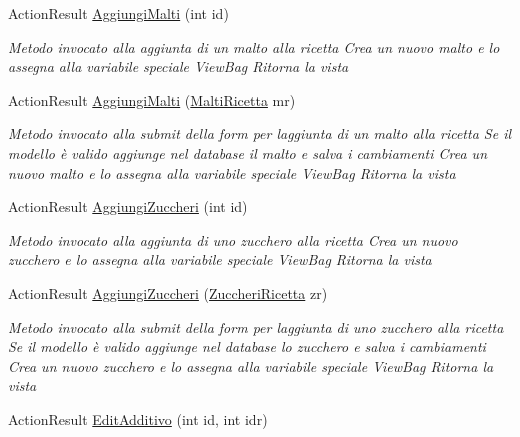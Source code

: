 \begin{DoxyCompactItemize}
Action\+Result \mbox{\hyperlink{class_brew_day2_1_1_controllers_1_1_ricette_controller_aeacbdb00e09e6b46a8837009f979d0a1}{Aggiungi\+Malti}} (int id)
\begin{DoxyCompactList}\small\item\em Metodo invocato alla aggiunta di un malto alla ricetta Crea un nuovo malto e lo assegna alla variabile speciale View\+Bag Ritorna la vista \end{DoxyCompactList}\item 
Action\+Result \mbox{\hyperlink{class_brew_day2_1_1_controllers_1_1_ricette_controller_a20029a56389066387f2c0f74b81a0bc5}{Aggiungi\+Malti}} (\mbox{\hyperlink{class_brew_day2_1_1_models_1_1_malti_ricetta}{Malti\+Ricetta}} mr)
\begin{DoxyCompactList}\small\item\em Metodo invocato alla submit della form per l\textquotesingle{}aggiunta di un malto alla ricetta Se il modello è valido aggiunge nel database il malto e salva i cambiamenti Crea un nuovo malto e lo assegna alla variabile speciale View\+Bag Ritorna la vista \end{DoxyCompactList}\item 
Action\+Result \mbox{\hyperlink{class_brew_day2_1_1_controllers_1_1_ricette_controller_a2f15ba984d68bd7b37f4e36ddd5447dc}{Aggiungi\+Zuccheri}} (int id)
\begin{DoxyCompactList}\small\item\em Metodo invocato alla aggiunta di uno zucchero alla ricetta Crea un nuovo zucchero e lo assegna alla variabile speciale View\+Bag Ritorna la vista \end{DoxyCompactList}\item 
Action\+Result \mbox{\hyperlink{class_brew_day2_1_1_controllers_1_1_ricette_controller_a7e6882de380d380ab2e6d4f4dc6aa65a}{Aggiungi\+Zuccheri}} (\mbox{\hyperlink{class_brew_day2_1_1_models_1_1_zuccheri_ricetta}{Zuccheri\+Ricetta}} zr)
\begin{DoxyCompactList}\small\item\em Metodo invocato alla submit della form per l\textquotesingle{}aggiunta di uno zucchero alla ricetta Se il modello è valido aggiunge nel database lo zucchero e salva i cambiamenti Crea un nuovo zucchero e lo assegna alla variabile speciale View\+Bag Ritorna la vista \end{DoxyCompactList}\item 
Action\+Result \mbox{\hyperlink{class_brew_day2_1_1_controllers_1_1_ricette_controller_a20536843bedae3acf20ec4a9991666da}{Edit\+Additivo}} (int id, int idr)

\end{DoxyCompactItemize}
